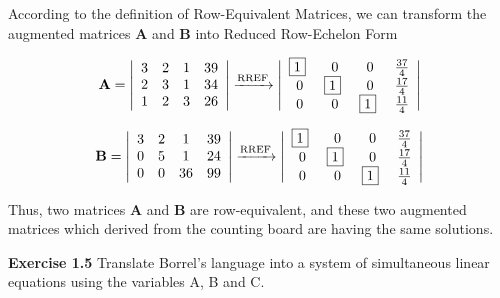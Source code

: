 \documentclass[12pt]{article}
\newcommand{\A} {\mathbf{A}}
\newcommand{\B} {\mathbf{B}}
\newcommand{\RREF} {Reduced Row-Echelon Form}
\newcommand{\REMM} {Row-Equivalent Matrices}
\begin{document}
According to the definition of \REMM,
we can transform the augmented matrices \(\A\) and \(\B\) into \RREF

\[
\A=
\left|
  \begin{array}{cccc}
    3 & 2 & 1 & 39 \\
    2 & 3 & 1 & 34 \\
    1 & 2 & 3 & 26 \\
  \end{array}
\right|
\xrightarrow[]{\text{RREF}}
\left|
\begin{array}{cccc}
  	$\boxed{1}$~ & 0 & 0 & \frac{37}{4} \\
    0 & $\boxed{1}$~ & 0 & \frac{17}{4} \\
    0 & 0 & $\boxed{1}$~ & \frac{11}{4} \\
  \end{array}
\right|
\]

\[
\B=
\left|
  \begin{array}{cccc}
    3 & 2 & 1 & 39 \\
    0 & 5 & 1 & 24 \\
    0 & 0 & 36 & 99 \\
  \end{array}
\right|
\xrightarrow[]{\text{RREF}}
\left|
\begin{array}{cccc}
  	$\boxed{1}$~ & 0 & 0 & \frac{37}{4} \\
    0 & $\boxed{1}$~ & 0 & \frac{17}{4} \\
    0 & 0 & $\boxed{1}$~ & \frac{11}{4} \\
  \end{array}
\right|
\]

Thus, two matrices \(\A\) and \(\B\) are row-equivalent,
and these two augmented matrices which derived from the counting board are having the same solutions.

\bigskip

\noindent\textbf{Exercise 1.5} Translate Borrel's language into a system of
simultaneous linear equations using the variables A, B and C.

\bigskip
\end{document}
